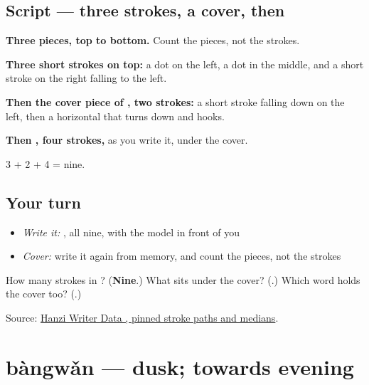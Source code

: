 \subsection*{Script — three strokes, a cover, then }

\begin{quote}
\end{quote}

\textbf{Three pieces, top to bottom.} Count the pieces, not the strokes.

\textbf{Three short strokes on top:} a dot on the left, a dot in the middle, and a short stroke on the right falling to the left.

\textbf{Then the cover piece of , two strokes:} a short stroke falling down on the left, then a horizontal that turns down and hooks.

\textbf{Then , four strokes,} as you write it, under the cover.

3 + 2 + 4 = nine.

\subsection*{Your turn}
\begin{itemize}
\raggedright
  \item \emph{Write it:} , all nine, with the model in front of you
  \item \emph{Cover:} write it again from memory, and count the pieces, not the strokes
\end{itemize}

\begin{tcolorbox}[breakable,colback=teal!4,colframe=teal!35!black,title={Before you move on}]
How many strokes in ? (\textbf{Nine}.) What sits under the cover? (\textbf{}.) Which word holds the cover too? (\textbf{}.)

Source: \href{https://raw.githubusercontent.com/chanind/hanzi-writer-data/68d10a4b21150cae5e1ebbd223eed289cf32d90c/data/\%E8\%A7\%89.json}{Hanzi Writer Data , pinned stroke paths and medians}.
\end{tcolorbox}
\section[bàngwǎn]{bàngwǎn — dusk; towards evening}

\label{lesson:ZH-C169-bangwan}



